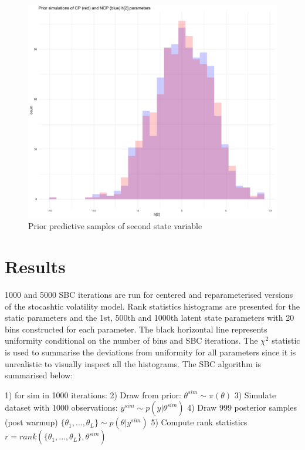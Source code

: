 \documentclass[12pt, a4paper]{article}
\begin{document}
        \begin{figure}[h]
            \centering
            \includegraphics[scale=0.1]{figures/ppc_h2.png}
            \caption{Prior predictive samples of second state variable}
        \end{figure}
        


\section{Results}
    1000 and 5000 SBC iterations are run for centered and reparameterised versions of the stocashtic volatility model. Rank statistics histograms are presented for the static parameters and the 1st, 500th and 1000th latent state parameters with 20 bins constructed for each parameter. The black horizontal line represents uniformity conditional on the number of bins and SBC iterations. The $\chi^2$ statistic is used to summarise the deviations from uniformity for all parameters since it is unrealistic to visually inspect all the histograms. The SBC algorithm is summarised below:

    1) for sim in 1000 iterations:
        2) Draw from prior: $\theta^{sim}\sim\pi (\theta)$
        3) Simulate dataset with 1000 observations: $y^{sim} \sim p(y|\theta^{sim})$
        4) Draw 999 posterior samples (post warmup) $\{\theta_1,\dots , \theta_{L}\} \sim p(\theta | y^{sim})$
        5) Compute rank statistics $r = rank(\{\theta_1,\dots , \theta_{L}\}, \theta^{sim})$
        
\end{document}

